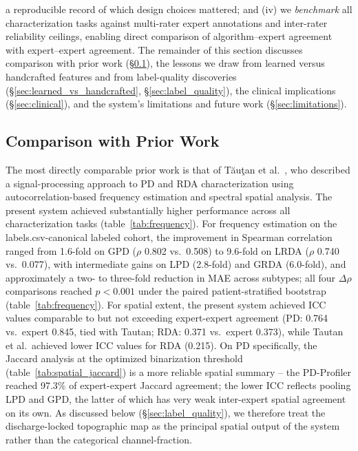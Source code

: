 \documentclass{iopjournal}
\begin{document}
a reproducible record of which design choices mattered; and (iv) we \emph{benchmark} all characterization tasks against multi-rater expert annotations and inter-rater reliability ceilings, enabling direct comparison of algorithm--expert agreement with expert--expert agreement. The remainder of this section discusses comparison with prior work (\S\ref{sec:comparison}), the lessons we draw from learned versus handcrafted features and from label-quality discoveries (\S\ref{sec:learned_vs_handcrafted}, \S\ref{sec:label_quality}), the clinical implications (\S\ref{sec:clinical}), and the system's limitations and future work (\S\ref{sec:limitations}).

\subsection{Comparison with Prior Work}
\label{sec:comparison}

The most directly comparable prior work is that of T\u{a}u\c{t}an et al.~\cite{tautan2025}, who described a signal-processing approach to PD and RDA characterization using autocorrelation-based frequency estimation and spectral spatial analysis. The present system achieved substantially higher performance across all characterization tasks (table~\ref{tab:frequency}). For frequency estimation on the labels.csv-canonical labeled cohort, the improvement in Spearman correlation ranged from 1.6-fold on GPD ($\rho$ 0.802 vs.\ 0.508) to 9.6-fold on LRDA ($\rho$ 0.740 vs.\ 0.077), with intermediate gains on LPD (2.8-fold) and GRDA (6.0-fold), and approximately a two- to three-fold reduction in MAE across subtypes; all four $\Delta\rho$ comparisons reached $p<0.001$ under the paired patient-stratified bootstrap (table~\ref{tab:frequency}). For spatial extent, the present system achieved ICC values comparable to but not exceeding expert-expert agreement (PD: 0.764 vs.\ expert 0.845, tied with Tautan; RDA: 0.371 vs.\ expert 0.373), while Tautan et al.\ achieved lower ICC values for RDA (0.215). On PD specifically, the Jaccard analysis at the optimized binarization threshold (table~\ref{tab:spatial_jaccard}) is a more reliable spatial summary -- the PD-Profiler reached 97.3\% of expert-expert Jaccard agreement; the lower ICC reflects pooling LPD and GPD, the latter of which has very weak inter-expert spatial agreement on its own. As discussed below (\S\ref{sec:label_quality}), we therefore treat the discharge-locked topographic map as the principal spatial output of the system rather than the categorical channel-fraction.
\end{document}
